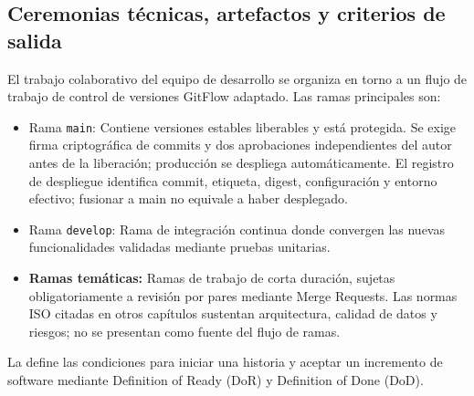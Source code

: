 \FloatBarrier
\subsection{Ceremonias técnicas, artefactos y criterios de salida}\label{sec:6-desarrollo-ceremonias}\label{sec:06-ceremonias-tecnicas-artefactos-y-criterios-de-salida}

El trabajo colaborativo del equipo de desarrollo se organiza en torno a un flujo de trabajo de control de versiones GitFlow adaptado. Las ramas principales son:

\begin{itemize}
\item Rama \texttt{main}: Contiene versiones estables liberables y está protegida. Se exige firma criptográfica de commits y dos aprobaciones independientes del autor antes de la liberación; producción se despliega automáticamente. El registro de despliegue identifica commit, etiqueta, digest, configuración y entorno efectivo; fusionar a main no equivale a haber desplegado.
\item Rama \texttt{develop}: Rama de integración continua donde convergen las nuevas funcionalidades validadas mediante pruebas unitarias.
\item \textbf{Ramas temáticas:} Ramas de trabajo de corta duración, sujetas obligatoriamente a revisión por pares mediante Merge Requests. Las normas ISO citadas en otros capítulos sustentan arquitectura, calidad de datos y riesgos; no se presentan como fuente del flujo de ramas.
\end{itemize}

La  define las condiciones para iniciar una historia y aceptar un incremento de software mediante Definition of Ready (DoR) y Definition of Done (DoD).


